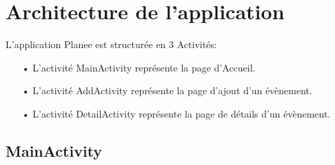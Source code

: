 \documentclass[12pt,a4paper]{report}
\begin{document}
\section{Architecture de l'application}
\begin{flushleft}
\justify
L'application Planee est structurée en 3 Activités:
\begin{itemize}
\item[•] L'activité MainActivity représente la page d'Accueil.
\item[•] L'activité AddActivity représente la page d'ajout d'un évènement.
\item[•] L'activité DetailActivity représente la page de détails d'un évènement.
\end{itemize}
\end{flushleft}
\subsection{MainActivity}
\end{document}
